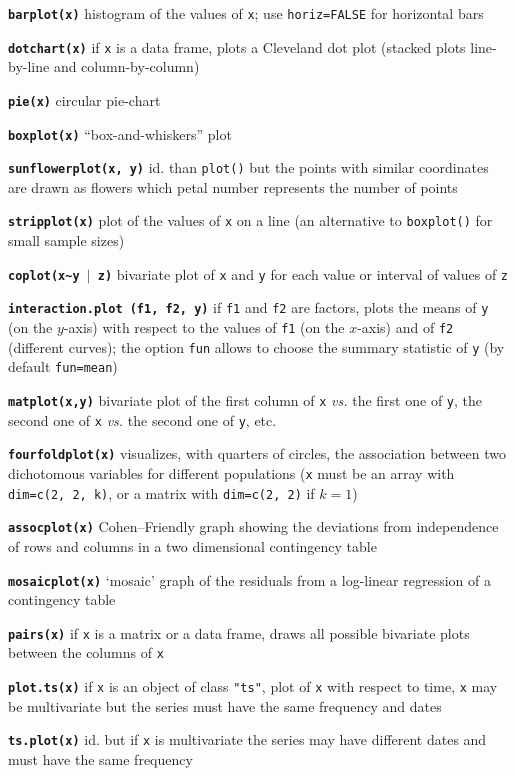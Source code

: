 \documentclass[10pt,landscape]{article}
\newcommand{\code}{\texttt}
\newcommand{\bcode}[1]{\texttt{\textbf{#1}}}
\begin{document}
\begin{multicols}{3}
\bcode{barplot(x)}  histogram of the values of \code{x}; use
\code{horiz=FALSE} for horizontal bars

\bcode{dotchart(x)}  if \code{x} is a data frame, plots a Cleveland dot plot (stacked plots line-by-line and column-by-column)

\bcode{pie(x)}  circular pie-chart

\bcode{boxplot(x)}  ``box-and-whiskers'' plot

\bcode{sunflowerplot(x, y)}  id. than \code{plot()} but the points with similar coordinates are drawn as flowers which petal number represents the number of points

\bcode{stripplot(x)}  plot of the values of \code{x} on a line (an alternative to \code{boxplot()} for small sample sizes)

\bcode{coplot(x\~{}y $\mid$ z)}  bivariate plot of \code{x} and \code{y} for each value or interval of values of \code{z}

\bcode{interaction.plot (f1, f2, y)}  if \code{f1} and \code{f2} are factors, plots the means of \code{y} (on the $y$-axis) with respect to the values of \code{f1} (on the $x$-axis) and of \code{f2} (different curves); the option \code{fun} allows to choose the summary statistic of \code{y} (by default \code{fun=mean})

\bcode{matplot(x,y)}  bivariate plot of the first column of \code{x} {\it vs.} the first one of \code{y}, the second one of \code{x} {\it vs.} the second one of \code{y}, etc.

\bcode{fourfoldplot(x)}  visualizes, with quarters of circles, the association between two dichotomous variables for different populations (\code{x} must be an array with \code{dim=c(2, 2, k)}, or a matrix with \code{dim=c(2, 2)} if $k=1$)

\bcode{assocplot(x)}  Cohen--Friendly graph showing the deviations  from independence of rows and columns in a two dimensional contingency table

\bcode{mosaicplot(x)}  `mosaic' graph of the residuals from a log-linear regression of a contingency table

\bcode{pairs(x)}  if \code{x} is a matrix or a data frame, draws all possible bivariate plots between the columns of \code{x}

\bcode{plot.ts(x)}  if \code{x} is an object of class \code{"ts"}, plot of \code{x} with respect to time, \code{x}  may be multivariate but the series must have the same frequency and dates

\bcode{ts.plot(x)}  id. but if \code{x} is multivariate the series may have different dates and must have the same frequency


\end{multicols}
\end{document}
